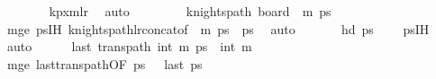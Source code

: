 \begin{isabellebody}
\ \ \ \ \ \ \isamarkupfalse%
\ kp{\isacharunderscore}{\kern0pt}{}xm{\isacharunderscore}{\kern0pt}lr\ \isamarkupfalse%
\ auto\isanewline
\ \ \ \ \isamarkupfalse%
\ \isamarkupfalse%
\ {}{\isacharcolon}{\kern0pt}\ {\isachardoublequoteopen}knights{\isacharunderscore}{\kern0pt}path\ {\isacharparenleft}{\kern0pt}board\ {}\ m{\isacharparenright}{\kern0pt}\ {\isacharquery}{\kern0pt}ps\ \ \ \ \ \ \ \ \ \isanewline
\ \ \ \ \ \ \isamarkupfalse%
\ m{\isacharunderscore}{\kern0pt}ge\ psIH\ knights{\isacharunderscore}{\kern0pt}path{\isacharunderscore}{\kern0pt}lr{\isacharunderscore}{\kern0pt}concat{\isacharbrackleft}{\kern0pt}of\ {}\ {\isachardoublequoteopen}m{\isacharminus}{\kern0pt}{}{\isachardoublequoteclose}\ ps\ {}\ {\isacharquery}{\kern0pt}ps\ \isamarkupfalse%
\ auto\isanewline
\isanewline
\ \ \ \ \isamarkupfalse%
\ {}{\isacharcolon}{\kern0pt}\ {\isachardoublequoteopen}hd\ {\isacharquery}{\kern0pt}ps\ {\isacharequal}{\kern0pt}\ {\isacharparenleft}{\kern0pt}{}{\isacharcomma}{\kern0pt}{}{\isacharparenright}{\kern0pt}{\isachardoublequoteclose}\ \isamarkupfalse%
\ psIH\ \isamarkupfalse%
\ auto\isanewline
\isanewline
\ \ \ \ \isamarkupfalse%
\ {\isachardoublequoteopen}last\ {\isacharparenleft}{\kern0pt}trans{\isacharunderscore}{\kern0pt}path\ {\isacharparenleft}{\kern0pt}{}{\isacharcomma}{\kern0pt}int\ {\isacharparenleft}{\kern0pt}m{\isacharminus}{\kern0pt}{}{\isacharparenright}{\kern0pt}{\isacharparenright}{\kern0pt}\ {\isacharquery}{\kern0pt}ps\ {\isacharequal}{\kern0pt}\ {\isacharparenleft}{\kern0pt}{}{\isacharcomma}{\kern0pt}int\ m{\isacharminus}{\kern0pt}{}{\isacharparenright}{\kern0pt}{\isachardoublequoteclose}\isanewline
\ \ \ \ \ \ \isamarkupfalse%
\ m{\isacharunderscore}{\kern0pt}ge\ last{\isacharunderscore}{\kern0pt}trans{\isacharunderscore}{\kern0pt}path{\isacharbrackleft}{\kern0pt}OF\ {\isacartoucheopen}{\isacharquery}{\kern0pt}ps\ {\isasymnoteq}\ {\isacharbrackleft}{\kern0pt}{\isacharbrackright}{\kern0pt}{\isacartoucheclose}\ {\isacartoucheopen}last\ {\isacharquery}{\kern0pt}ps\ {\isacharequal}{\kern0pt}\ {\isacharparenleft}{\kern0pt}{}{\isacharcomma}{\kern0pt}{}{\isacharparenright}{\kern0pt}{\isacartoucheclose}{\isacharbrackright}{\kern0pt}\ \isamarkupfalse%

\end{isabellebody}
